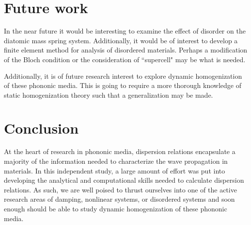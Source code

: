 \documentclass{article}
\begin{document}
\section{Future work}
In the near future it would be interesting to examine the effect of disorder on 
the diatomic mass spring system. Additionally, it would be of interest to 
develop a finite element method for analysis of disordered materials. Perhaps a 
modification of the Bloch condition or the consideration of ``supercell" may be 
what is needed.

Additionally, it is of future research interest to explore dynamic 
homogenization of these phononic media. This is going to require a more 
thorough knowledge of static homogenization theory such that a generalization 
may be made.

\section{Conclusion}
At the heart of research in phononic media, dispersion relations encapsulate a 
majority of the information needed to characterize the wave propagation in 
materials. In this independent study, a large amount of effort was put into 
developing the analytical and computational skills needed to calculate 
dispersion relations. As such, we are well poised to thrust ourselves into one 
of the active research areas of damping, nonlinear systems, or disordered 
systems and soon enough should be able to study dynamic homogenization of these 
phononic media. 
\end{document}
